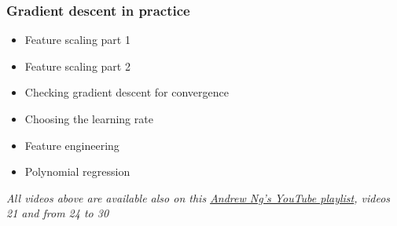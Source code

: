 \subsubsection*{Gradient descent in practice}
\begin{itemize}
  \item Feature scaling part 1
  \item Feature scaling part 2
  \item Checking gradient descent for convergence
  \item Choosing the learning rate
  \item Feature engineering
  \item Polynomial regression
\end{itemize}
\emph{All videos above are available also on this \href{https://youtube.com/playlist?list=PLkDaE6sCZn6FNC6YRfRQc_FbeQrF8BwGI&feature=shared}{Andrew Ng's YouTube playlist}, videos 21 and from 24 to 30}